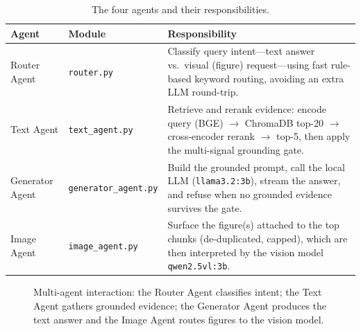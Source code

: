 \documentclass[12pt,a4paper]{report}
\begin{document}
\begin{table}[htbp]
\centering
\caption{The four agents and their responsibilities.}
\label{tab:agents}
\begin{tabular}{@{}p{3.0cm}p{3.0cm}p{6.6cm}@{}}
\toprule
\textbf{Agent} & \textbf{Module} & \textbf{Responsibility} \\
\midrule
Router Agent    & \texttt{router.py}          & Classify query intent---text answer vs.\ visual (figure) request---using fast rule-based keyword routing, avoiding an extra LLM round-trip. \\
Text Agent      & \texttt{text\_agent.py}     & Retrieve and rerank evidence: encode query (BGE) $\rightarrow$ ChromaDB top-20 $\rightarrow$ cross-encoder rerank $\rightarrow$ top-5, then apply the multi-signal grounding gate. \\
Generator Agent & \texttt{generator\_agent.py}& Build the grounded prompt, call the local LLM (\texttt{llama3.2:3b}), stream the answer, and refuse when no grounded evidence survives the gate. \\
Image Agent     & \texttt{image\_agent.py}    & Surface the figure(s) attached to the top chunks (de-duplicated, capped), which are then interpreted by the vision model \texttt{qwen2.5vl:3b}. \\
\bottomrule
\end{tabular}
\end{table}

\begin{figure}[htbp]
\centering
{}
\caption{Multi-agent interaction: the Router Agent classifies intent; the Text
Agent gathers grounded evidence; the Generator Agent produces the text answer and
the Image Agent routes figures to the vision model.}
\label{fig:agents}
\end{figure}
\end{document}
